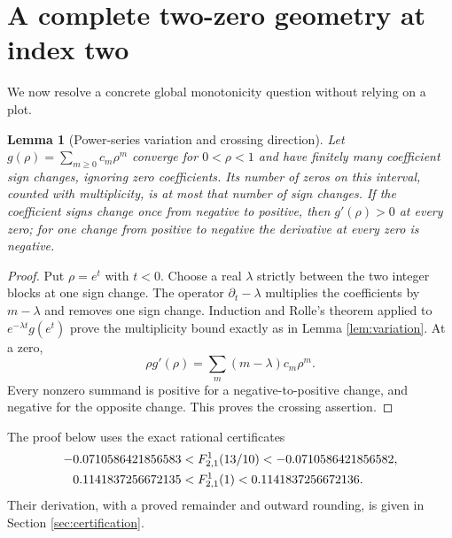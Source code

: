 \documentclass[11pt]{article}
\numberwithin{equation}{section}
\newtheorem{lemma}[theorem]{Lemma}
\theoremstyle{definition}\newtheorem{definition}[theorem]{Definition}
\theoremstyle{remark}\newtheorem{remark}[theorem]{Remark}
\begin{document}
\section{A complete two-zero geometry at index two}\label{sec:n2}
We now resolve a concrete global monotonicity question without relying on a plot.

\begin{lemma}[Power-series variation and crossing direction]\label{lem:descartes}
Let $g(\rho)=\sum_{m\geq0}c_m\rho^m$ converge for $0<\rho<1$ and have finitely many coefficient sign changes, ignoring zero coefficients. Its number of zeros on this interval, counted with multiplicity, is at most that number of sign changes. If the coefficient signs change once from negative to positive, then $g'(\rho)>0$ at every zero; for one change from positive to negative the derivative at every zero is negative.
\end{lemma}
\begin{proof}
Put $\rho=e^t$ with $t<0$. Choose a real $\lambda$ strictly between the two integer blocks at one sign change. The operator $\partial_t-\lambda$ multiplies the coefficients by $m-\lambda$ and removes one sign change. Induction and Rolle's theorem applied to $e^{-\lambda t}g(e^t)$ prove the multiplicity bound exactly as in Lemma \ref{lem:variation}. At a zero,
\[
\rho g'(\rho)=\sum_m(m-\lambda)c_m\rho^m.
\]
Every nonzero summand is positive for a negative-to-positive change, and negative for the opposite change. This proves the crossing assertion.
\end{proof}

The proof below uses the exact rational certificates
\begin{align}\label{eq:n2anchors}
-0.0710586421856583&<F_{2,1}^{1}(13/10)<-0.0710586421856582,\notag\\
0.1141837256672135&<F_{2,1}^{1}(1)<0.1141837256672136.
\end{align}
Their derivation, with a proved remainder and outward rounding, is given in Section \ref{sec:certification}.
\end{document}
